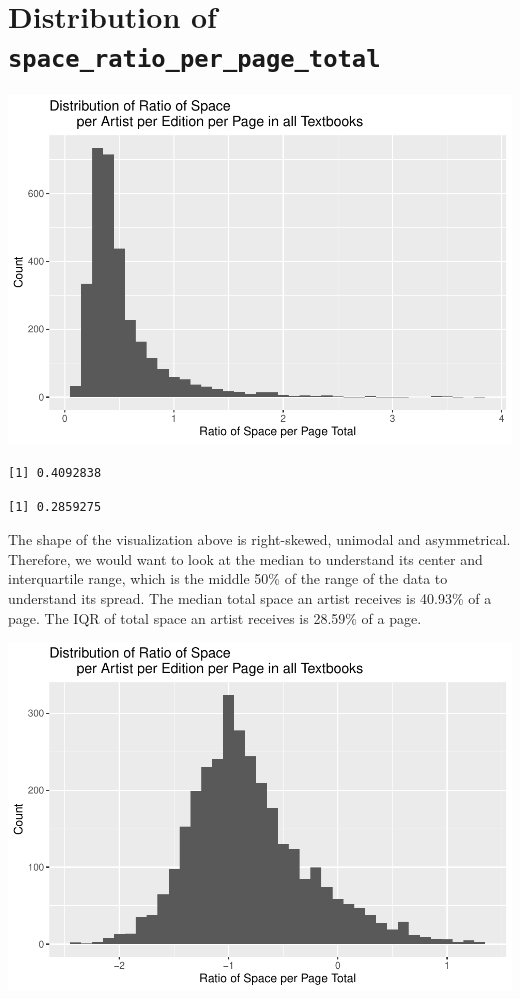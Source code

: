 \documentclass[
  letterpaper,
  DIV=11,
  numbers=noendperiod]{scrreprt}
\begin{document}
\hypertarget{distribution-of-space_ratio_per_page_total}{%
\section{\texorpdfstring{Distribution of
\texttt{space\_ratio\_per\_page\_total}}{Distribution of space\_ratio\_per\_page\_total}}\label{distribution-of-space_ratio_per_page_total}}

\includegraphics{Chapter1/Chapter1_files/figure-pdf/spaceratioperpagetotal-1.pdf}

\begin{verbatim}
[1] 0.4092838
\end{verbatim}

\begin{verbatim}
[1] 0.2859275
\end{verbatim}

The shape of the visualization above is right-skewed, unimodal and
asymmetrical. Therefore, we would want to look at the median to
understand its center and interquartile range, which is the middle 50\%
of the range of the data to understand its spread. The median total
space an artist receives is 40.93\% of a page. The IQR of total space an
artist receives is 28.59\% of a page.

\includegraphics{Chapter1/Chapter1_files/figure-pdf/logspaceratioperpagetotal-1.pdf}
\end{document}
